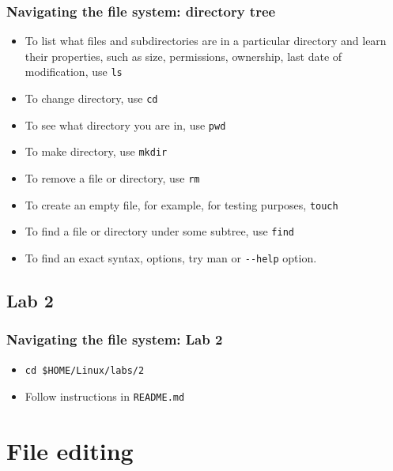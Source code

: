 \documentclass{beamer}
\begin{document}
\begin{frame}[fragile]
  \frametitle{Navigating the file system: directory tree}
  \begin{itemize}
  \item To list what files and subdirectories are in a particular directory and learn their properties, such as size, permissions, ownership, last date of modification, use {\color{mycolorcli}\verb|ls|}
  \item To change directory, use {\color{mycolorcli}\verb|cd|}
  \item To see what directory you are in, use {\color{mycolorcli}\verb|pwd|}
  \item To make directory, use {\color{mycolorcli}\verb|mkdir|}
  \item To remove a file or directory, use {\color{mycolorcli}\verb|rm|}
  \item To create an empty file, for example, for testing purposes, {\color{mycolorcli}\verb|touch|}
  \item To find a file or directory under some subtree, use {\color{mycolorcli}\verb|find|} 
  \item To find an exact syntax, options, try {\color{mycolorcli}man} or {\color{mycolorcli}\verb|--help|} option.
  \end{itemize}
\end{frame}


\subsection{Lab 2}
\begin{frame}[fragile]
  \frametitle{Navigating the file system: Lab 2}

\begin{itemize}
\item
{\color{mycolorcli}
\begin{verbatim}
cd $HOME/Linux/labs/2
\end{verbatim}
}
\item Follow instructions in {\color{mycolorcli}\verb|README.md|}
\end{itemize}

\end{frame}

\section{File editing}
\end{document}
